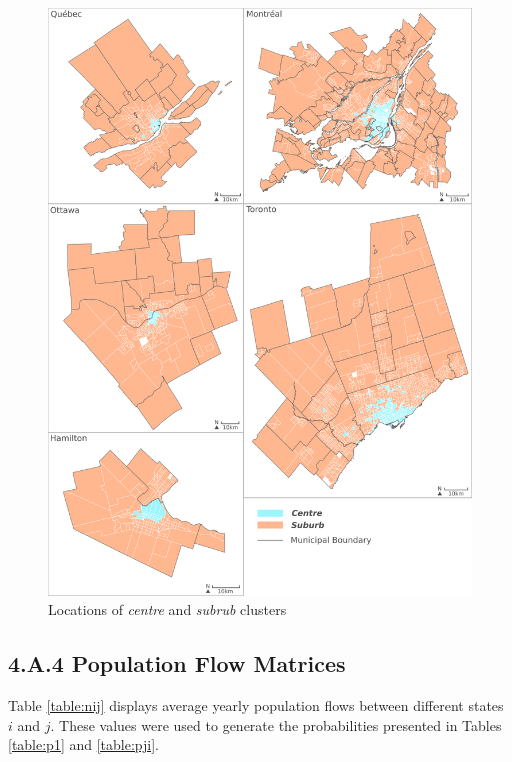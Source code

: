 \begin{figure}[H]
	\centering
	\includegraphics[width=6in]{figures/E_mini_1.png}
	\caption{Locations of \textit{centre} and \textit{subrub} clusters}
	\label{fig:mm2}
\end{figure}





\subsection*{4.A.4 \hspace{2mm} Population Flow Matrices}




Table \ref{table:nij} displays average yearly population flows between different states $i$ and $j$. These values were used to generate the probabilities presented in Tables \ref{table:p1} and \ref{table:pji}.



